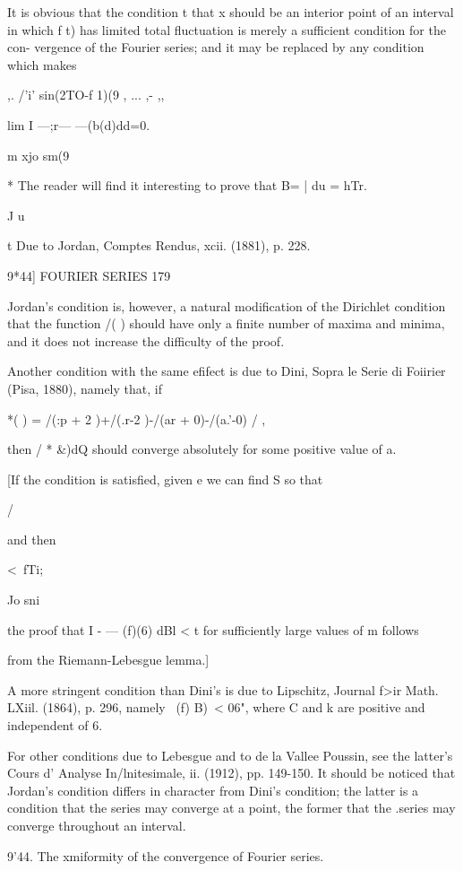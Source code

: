 It is obvious that the condition t that x should be an interior point
of an interval in which f t) has limited total fluctuation is merely a
sufficient condition for the con- vergence of the Fourier series; and
it may be replaced by any condition which makes

,. /'i' sin(2TO-f 1)(9 , ... ,- ,,

lim I —;r— —(b(d)dd=0.

m xjo sm(9

* The reader will find it interesting to prove that B= | du = hTr.

J u

t Due to Jordan, Comptes Rendus, xcii. (1881), p. 228.

9*44] FOURIER SERIES 179

Jordan's condition is, however, a natural modification of the
Dirichlet condition that the function /( ) should have only a finite
number of maxima and minima, and it does not increase the difficulty
of the proof.

Another condition with the same efifect is due to Dini, Sopra le Serie
di Foiirier (Pisa, 1880), namely that, if

*( ) = /(:p + 2 )+/(.r-2 )-/(ar + 0)-/(a.'-0) / ,

then / * \&)dQ should converge absolutely for some positive value of
a.

[If the condition is satisfied, given e we can find S so that

/

and then

<\ fTi;

Jo sni

the proof that I - — (f)(6) dBl < t for sufficiently large values of m
follows

from the Riemann-Lebesgue lemma.]

A more stringent condition than Dini's is due to Lipschitz, Journal
f>ir Math. LXiil. (1864), p. 296, namely \ (f) B)\ < 06", where C and
k are positive and independent of 6.

For other conditions due to Lebesgue and to de la Vallee Poussin, see
the latter's Cours d' Analyse In/lnitesimale, ii. (1912), pp. 149-150.
It should be noticed that Jordan's condition differs in character from
Dini's condition; the latter is a condition that the series may
converge at a point, the former that the .series may converge
throughout an interval.

9'44. The xmiformity of the convergence of Fourier series.

